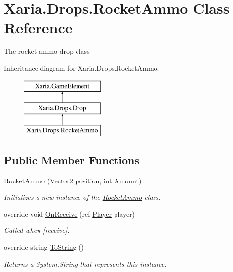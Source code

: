 \hypertarget{classXaria_1_1Drops_1_1RocketAmmo}{}\section{Xaria.\+Drops.\+Rocket\+Ammo Class Reference}
\label{classXaria_1_1Drops_1_1RocketAmmo}


The rocket ammo drop class  


Inheritance diagram for Xaria.\+Drops.\+Rocket\+Ammo\+:\begin{figure}[H]
\begin{center}
\leavevmode
\includegraphics[height=3.000000cm]{classXaria_1_1Drops_1_1RocketAmmo}
\end{center}
\end{figure}
\subsection*{Public Member Functions}
\begin{DoxyCompactItemize}
\item 
\hyperlink{classXaria_1_1Drops_1_1RocketAmmo_af81c829bd216258cc212d9349c027a13}{Rocket\+Ammo} (Vector2 position, int Amount)
\begin{DoxyCompactList}\small\item\em Initializes a new instance of the \hyperlink{classXaria_1_1Drops_1_1RocketAmmo}{Rocket\+Ammo} class. \end{DoxyCompactList}\item 
override void \hyperlink{classXaria_1_1Drops_1_1RocketAmmo_a5a860b6a2c037fa5f24416cf9296055d}{On\+Receive} (ref \hyperlink{classXaria_1_1Player}{Player} player)
\begin{DoxyCompactList}\small\item\em Called when \mbox{[}receive\mbox{]}. \end{DoxyCompactList}\item 
override string \hyperlink{classXaria_1_1Drops_1_1RocketAmmo_aafefb9dee3587e29c16eaa07b45228ad}{To\+String} ()
\begin{DoxyCompactList}\small\item\em Returns a System.\+String that represents this instance. \end{DoxyCompactList}\end{DoxyCompactItemize}
